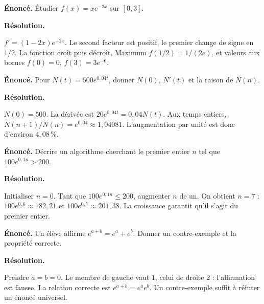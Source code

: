 \documentclass[11pt,a4paper]{article}
\begin{document}
\par\noindent\begin{minipage}{\linewidth}
{\small\color{Muted}\textbf{Énoncé.} Étudier $f(x)=x e^{-2x}$ sur $[0,3]$.}
\par\medskip
\textbf{Résolution.}\par
$f\prime=(1-2x)e^{-2x}$. Le second facteur est positif, le premier change de signe en $1/2$. La fonction croît puis décroît. Maximum $f(1/2)=1/(2e)$, et valeurs aux bornes $f(0)=0$, $f(3)=3e^{-6}$.
\end{minipage}\par
\par\noindent\begin{minipage}{\linewidth}
{\small\color{Muted}\textbf{Énoncé.} Pour $N(t)=500e^{0,04t}$, donner $N(0)$, $N\prime(t)$ et la raison de $N(n)$.}
\par\medskip
\textbf{Résolution.}\par
$N(0)=500$. La dérivée est $20e^{0,04t}=0,04N(t)$. Aux temps entiers, $N(n+1)/N(n)=e^{0,04}\approx1,04081$. L’augmentation par unité est donc d’environ $4,08\,\%$.
\end{minipage}\par
\par\noindent\begin{minipage}{\linewidth}
{\small\color{Muted}\textbf{Énoncé.} Décrire un algorithme cherchant le premier entier $n$ tel que $100e^{0,1n}>200$.}
\par\medskip
\textbf{Résolution.}\par
Initialiser $n=0$. Tant que $100e^{0,1n}\le200$, augmenter $n$ de un. On obtient $n=7$ : $100e^{0,6}\approx182,21$ et $100e^{0,7}\approx201,38$. La croissance garantit qu’il s’agit du premier entier.
\end{minipage}\par
\par\noindent\begin{minipage}{\linewidth}
{\small\color{Muted}\textbf{Énoncé.} Un élève affirme $e^{a+b}=e^a+e^b$. Donner un contre-exemple et la propriété correcte.}
\par\medskip
\textbf{Résolution.}\par
Prendre $a=b=0$. Le membre de gauche vaut $1$, celui de droite $2$ : l’affirmation est fausse. La relation correcte est $e^{a+b}=e^ae^b$. Un contre-exemple suffit à réfuter un énoncé universel.
\end{minipage}\par
\end{document}
